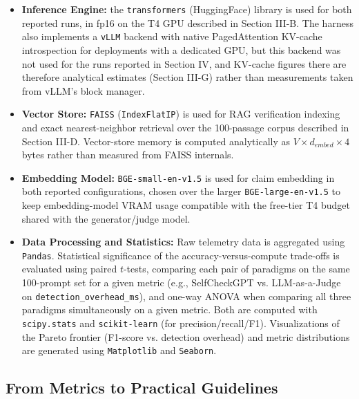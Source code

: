 \documentclass[conference]{IEEEtran}
\begin{document}
\begin{itemize}
    \item \textbf{Inference Engine:} the \texttt{transformers} (HuggingFace) library is used for both reported runs, in fp16 on the T4 GPU described in Section III-B. The harness also implements a \texttt{vLLM} backend with native PagedAttention KV-cache introspection \cite{kwon2023efficient} for deployments with a dedicated GPU, but this backend was not used for the runs reported in Section IV, and KV-cache figures there are therefore analytical estimates (Section III-G) rather than measurements taken from vLLM's block manager.
    \item \textbf{Vector Store:} \texttt{FAISS} (\texttt{IndexFlatIP}) is used for RAG verification indexing and exact nearest-neighbor retrieval over the 100-passage corpus described in Section III-D. Vector-store memory is computed analytically as $V \times d_{embed} \times 4$ bytes rather than measured from FAISS internals.
    \item \textbf{Embedding Model:} \texttt{BGE-small-en-v1.5} is used for claim embedding in both reported configurations, chosen over the larger \texttt{BGE-large-en-v1.5} to keep embedding-model VRAM usage compatible with the free-tier T4 budget shared with the generator/judge model.
    \item \textbf{Data Processing and Statistics:} Raw telemetry data is aggregated using \texttt{Pandas}. Statistical significance of the accuracy-versus-compute trade-offs is evaluated using paired $t$-tests, comparing each pair of paradigms on the same 100-prompt set for a given metric (e.g., SelfCheckGPT vs. LLM-as-a-Judge on \texttt{detection\_overhead\_ms}), and one-way ANOVA when comparing all three paradigms simultaneously on a given metric. Both are computed with \texttt{scipy.stats} and \texttt{scikit-learn} (for precision/recall/F1). Visualizations of the Pareto frontier (F1-score vs. detection overhead) and metric distributions are generated using \texttt{Matplotlib} and \texttt{Seaborn}.
\end{itemize}

\subsection{From Metrics to Practical Guidelines}
\end{document}
